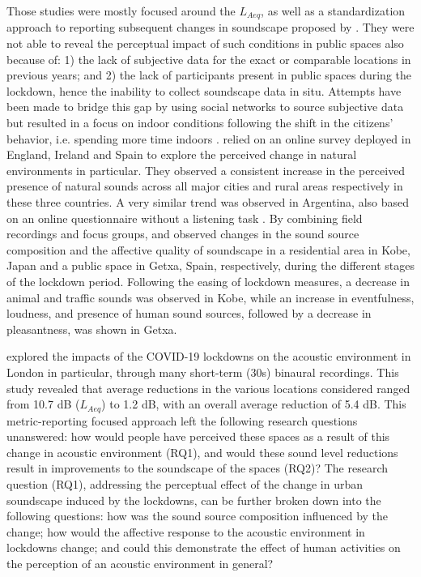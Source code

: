  Those studies were mostly focused around the $L_{Aeq}$, as well as a standardization approach to reporting subsequent changes in soundscape proposed by \citet{asensio_taxonomy_2020}. They were not able to reveal the perceptual impact of such conditions in public spaces also because of: 1) the lack of subjective data for the exact or comparable locations in previous years; and 2) the lack of participants present in public spaces during the lockdown, hence the inability to collect soundscape data in situ. Attempts have been made to bridge this gap by using social networks to source subjective data but resulted in a focus on indoor conditions following the shift in the citizens’ behavior, i.e. spending more time indoors \citep{bartalucci_survey_2021, lee_attitudes_2021}. \citet{garrido_greenCOVID_2021} relied on an online survey deployed in England, Ireland and Spain to explore the perceived change in natural environments in particular. They observed a consistent increase in the perceived presence of natural sounds across all major cities and rural areas respectively in these three countries. A very similar trend was observed in Argentina, also based on an online questionnaire without a listening task \citep{maggi_perception_2021}. By combining field recordings and focus groups,  \citet{sakagami_covid_2020} and \citet{lenzi_soundscape_2021} observed changes in the sound source composition and the affective quality of soundscape in a residential area in Kobe, Japan and a public space in Getxa, Spain, respectively, during the different stages of the lockdown period. Following the easing of lockdown measures, a decrease in animal and traffic sounds was observed in Kobe, while an increase in eventfulness, loudness, and presence of human sound sources, followed by a decrease in pleasantness, was shown in Getxa.

\citet{aletta_assessing_2020} explored the impacts of the COVID-19 lockdowns on the acoustic environment in London in particular, through many short-term (30s) binaural recordings. This study revealed that average reductions in the various locations considered ranged from 10.7 dB ($L_{Aeq}$) to 1.2 dB, with an overall average reduction of 5.4 dB.
This metric-reporting focused approach left the following research questions unanswered: how would people have perceived these spaces as a result of this change in acoustic environment (RQ1), and would these sound level reductions result in improvements to the soundscape of the spaces (RQ2)? The  research question (RQ1), addressing the perceptual effect of the change in urban soundscape induced by the lockdowns, can be further broken down into the following questions: how was the sound source composition influenced by the change; how would the affective response to the acoustic environment in lockdowns change; and could this demonstrate the effect of human activities on the perception of an acoustic environment in general?

